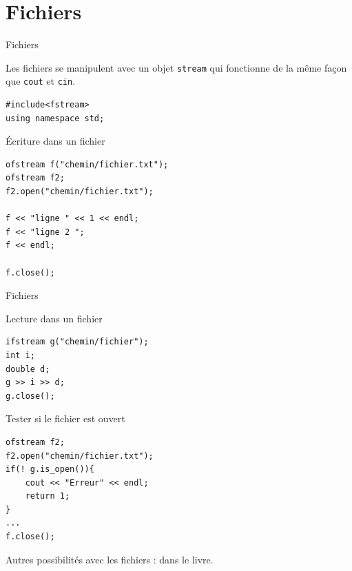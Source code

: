 \section{Fichiers}

\begin{frame}[fragile]{Fichiers}

Les fichiers se manipulent avec un objet \texttt{stream} qui fonctionne de la même façon que \texttt{cout} et \texttt{cin}.

\begin{verbatim}
#include<fstream>
using namespace std;
\end{verbatim}

\begin{block}{Écriture dans un fichier}
\begin{verbatim}
ofstream f("chemin/fichier.txt");
ofstream f2;
f2.open("chemin/fichier.txt");

f << "ligne " << 1 << endl;
f << "ligne 2 ";
f << endl;

f.close();
\end{verbatim}
\end{block}
\end{frame}

\begin{frame}[fragile]{Fichiers}

\begin{block}{Lecture dans un fichier}
\begin{verbatim}
ifstream g("chemin/fichier");
int i;
double d;
g >> i >> d;
g.close();
\end{verbatim}
\end{block}

\begin{block}{Tester si le fichier est ouvert}
\begin{verbatim}
ofstream f2;
f2.open("chemin/fichier.txt");
if(! g.is_open()){
    cout << "Erreur" << endl;
    return 1;
}
...
f.close();
\end{verbatim}
\end{block}

Autres possibilités avec les fichiers : dans le livre.

\end{frame}

